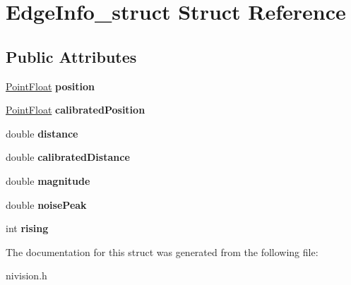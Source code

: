 \hypertarget{structEdgeInfo__struct}{
\section{EdgeInfo\_\-struct Struct Reference}
\label{structEdgeInfo__struct}
}
\subsection*{Public Attributes}
\begin{DoxyCompactItemize}
\item 
\hypertarget{structEdgeInfo__struct_a543af6912de90b9b86264463f0c6daf8}{
\hyperlink{structPointFloat__struct}{PointFloat} {\bfseries position}}
\label{structEdgeInfo__struct_a543af6912de90b9b86264463f0c6daf8}

\item 
\hypertarget{structEdgeInfo__struct_a0c49ed4edacae6bde0f72c17c1a5df03}{
\hyperlink{structPointFloat__struct}{PointFloat} {\bfseries calibratedPosition}}
\label{structEdgeInfo__struct_a0c49ed4edacae6bde0f72c17c1a5df03}

\item 
\hypertarget{structEdgeInfo__struct_a153ae30d34080e6245a07da8609b5711}{
double {\bfseries distance}}
\label{structEdgeInfo__struct_a153ae30d34080e6245a07da8609b5711}

\item 
\hypertarget{structEdgeInfo__struct_a4685297d102c2d351ec07074d0148bdb}{
double {\bfseries calibratedDistance}}
\label{structEdgeInfo__struct_a4685297d102c2d351ec07074d0148bdb}

\item 
\hypertarget{structEdgeInfo__struct_a334ae7914f16a4850a434bd02609d732}{
double {\bfseries magnitude}}
\label{structEdgeInfo__struct_a334ae7914f16a4850a434bd02609d732}

\item 
\hypertarget{structEdgeInfo__struct_acba687524ba6cabb118548f5b1a62d32}{
double {\bfseries noisePeak}}
\label{structEdgeInfo__struct_acba687524ba6cabb118548f5b1a62d32}

\item 
\hypertarget{structEdgeInfo__struct_aeb6076edae5deb044ad6e0a1acff8e16}{
int {\bfseries rising}}
\label{structEdgeInfo__struct_aeb6076edae5deb044ad6e0a1acff8e16}

\end{DoxyCompactItemize}


The documentation for this struct was generated from the following file:\begin{DoxyCompactItemize}
\item 
nivision.h\end{DoxyCompactItemize}
